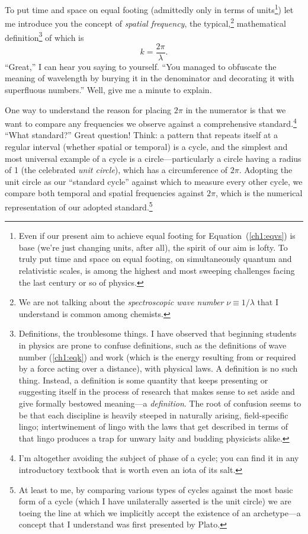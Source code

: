 To put time and space on equal footing (admittedly only in terms of
units\footnote{Even if our present aim to achieve equal footing for
  Equation~(\ref{ch1:eqvs}) is base (we're just changing units, after all), the
  spirit of our aim is lofty. To truly put time and space on equal footing, on
  simultaneously quantum and relativistic scales, is among the highest and most
  sweeping challenges facing the last century or so of physics.}) let me
introduce you the concept of \emph{spatial frequency}, the typical,\footnote{We
  are not talking about the \emph{spectroscopic wave number}
  $\nu \equiv 1 / \lambda$ that I understand is common among chemists.}
mathematical definition\footnote{Definitions, the troublesome things. I have
  observed that beginning students in physics are prone to confuse definitions,
  such as the definitions of wave number (\ref{ch1:eqk}) and work (which is the
  energy resulting from or required by a force acting over a distance), with
  physical laws. A definition is no such thing. Instead, a definition is some
  quantity that keeps presenting or suggesting itself in the process of research
  that makes sense to set aside and give formally bestowed meaning---a
  \emph{definition}. The root of confusion seems to be that each discipline is
  heavily steeped in naturally arising, field-specific lingo; intertwinement of
  lingo with the laws that get described in terms of that lingo produces a trap
  for unwary laity and budding physicists alike.} of which is
\begin{equation}
  \label{ch1:eqk}
  k = \dfrac{2 \pi}{\lambda}.
\end{equation}
``Great,'' I can hear you saying to yourself. ``You managed to obfuscate the
meaning of wavelength by burying it in the denominator and decorating it with
superfluous numbers.'' Well, give me a minute to explain.

One way to understand the reason for placing $2 \pi$ in the numerator is that we
want to compare any frequencies we observe against a comprehensive
standard.\footnote{I'm altogether avoiding the subject of phase of a cycle; you
  can find it in any introductory textbook that is worth even an iota of its
  salt.} ``What standard?'' Great question! Think: a pattern that repeats itself
at a regular interval (whether spatial or temporal) is a cycle, and the simplest
and most universal example of a cycle is a circle---particularly a circle having
a radius of 1 (the celebrated \emph{unit circle}), which has a circumference of
$2 \pi$.  Adopting the unit circle as our ``standard cycle'' against which to
measure every other cycle, we compare both temporal and spatial frequencies
against $2 \pi$, which is the numerical representation of our adopted
standard.\footnote{At least to me, by comparing various types of cycles against
  the most basic form of a cycle (which I have unilaterally asserted is the unit
  circle) we are toeing the line at which we implicitly accept the existence of
  an archetype---a concept that I understand was first presented by Plato.}

